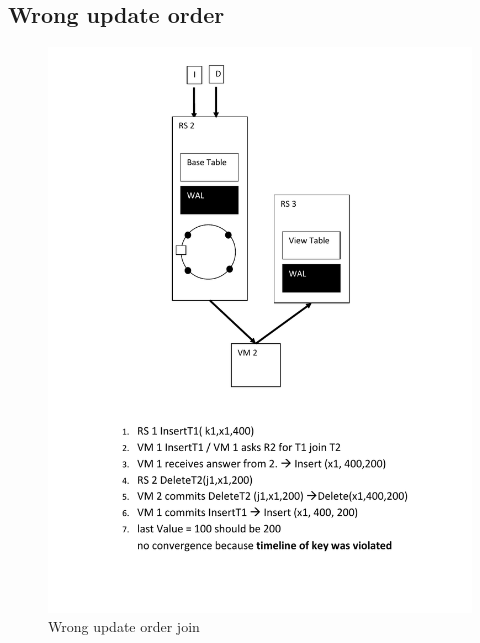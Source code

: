 \subsection{Wrong update order}
\begin{figure}[h!]
  \centering
    \includegraphics[scale=0.8]{figures/CO_WrongUpdateOrderJoin}
     \caption{Wrong update order join}
    \label{fig:co_wrongupdateorderjoin}
\end{figure}
\newpage
